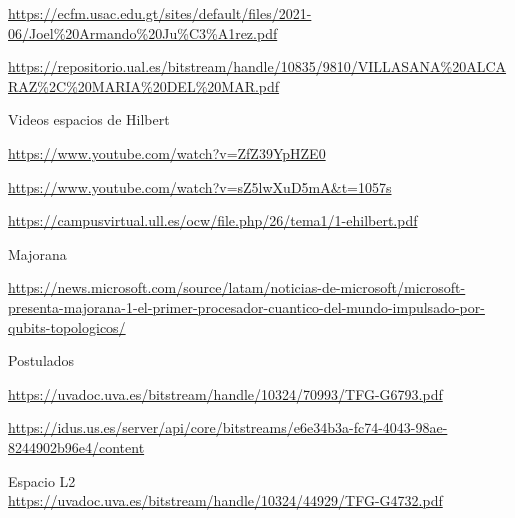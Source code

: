 \documentclass{article}
\numberwithin{equation}{section} %
\begin{document}
        \url{https://ecfm.usac.edu.gt/sites/default/files/2021-06/Joel%20Armando%20Ju%C3%A1rez.pdf}
        \vspace{2mm}

        \url{https://repositorio.ual.es/bitstream/handle/10835/9810/VILLASANA%20ALCARAZ%2C%20MARIA%20DEL%20MAR.pdf}
        \vspace{2mm}

        Videos espacios de Hilbert\par
        \url{https://www.youtube.com/watch?v=ZfZ39YpHZE0}
        \vspace{2mm}

        \url{https://www.youtube.com/watch?v=sZ5lwXuD5mA&t=1057s}
        \vspace{2mm}

        \url{https://campusvirtual.ull.es/ocw/file.php/26/tema1/1-ehilbert.pdf}
        \vspace{2mm}

        Majorana\par
        \url{https://news.microsoft.com/source/latam/noticias-de-microsoft/microsoft-presenta-majorana-1-el-primer-procesador-cuantico-del-mundo-impulsado-por-qubits-topologicos/}
        \vspace{2mm}

        Postulados\par
        \url{https://uvadoc.uva.es/bitstream/handle/10324/70993/TFG-G6793.pdf}
        \vspace{2mm}

        \url{https://idus.us.es/server/api/core/bitstreams/e6e34b3a-fc74-4043-98ae-8244902b96e4/content}
        \vspace{2mm}

        Espacio L2 \\
        \url{https://uvadoc.uva.es/bitstream/handle/10324/44929/TFG-G4732.pdf}

    
\end{document}
